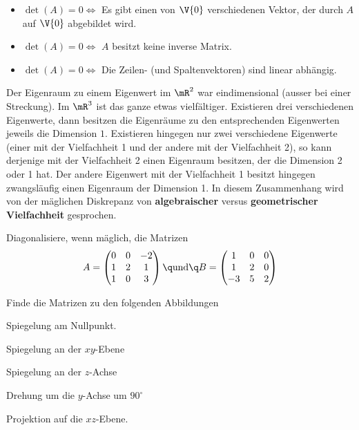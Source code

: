 \documentclass[%
11pt,%
twoside,%
titlepage,%
german,%
headsepline%
]{scrartcl}
\begin{document}
\begin{itemize}
\item $\det(A)=0\Leftrightarrow$ Es gibt einen von $\V{0}$ verschiedenen Vektor, der durch $A$ auf $\V{0}$ abgebildet wird.
\item $\det(A)=0\Leftrightarrow$ $A$ besitzt keine inverse Matrix.
\item $\det(A)=0\Leftrightarrow$ Die Zeilen- (und Spaltenvektoren) sind linear abhängig.
\end{itemize}

\begin{bem}
Der Eigenraum zu einem Eigenwert im $\mR^2$ war eindimensional (ausser bei einer Streckung). Im $\mR^3$ ist das ganze etwas vielfältiger. Existieren drei verschiedenen Eigenwerte, dann besitzen die Eigenräume zu den entsprechenden Eigenwerten jeweils die Dimension $1$. Existieren hingegen nur zwei verschiedene Eigenwerte (einer mit der Vielfachheit 1 und der andere mit der Vielfachheit 2), so kann derjenige mit der Vielfachheit 2 einen Eigenraum besitzen, der die Dimension 2 oder 1 hat. Der andere Eigenwert mit der Vielfachheit 1 besitzt hingegen zwangsläufig einen Eigenraum der Dimension 1. In diesem Zusammenhang wird von der mäglichen Diskrepanz von \textbf{algebraischer} versus \textbf{geometrischer Vielfachheit} gesprochen.
\end{bem}

\begin{ueb}
Diagonalisiere, wenn mäglich, die Matrizen
$$A=
\begin{pmatrix}
0&0&-2\\
1&2&1\\
1&0&3\\
\end{pmatrix}
\q\text{und}\q
B=
\begin{pmatrix}
1&0&0\\
1&2&0\\
-3&5&2\\
\end{pmatrix}$$
\end{ueb}

\begin{ueb}\label{ueb:mats}
Finde die Matrizen zu den folgenden Abbildungen
\begin{enumeratea}
\item Spiegelung am Nullpunkt.
\item Spiegelung an der $xy$-Ebene
\item Spiegelung an der $z$-Achse
\item Drehung um die $y$-Achse um $90^\circ$
\item Projektion auf die $xz$-Ebene.
\end{enumeratea}
\end{ueb}
\end{document}
